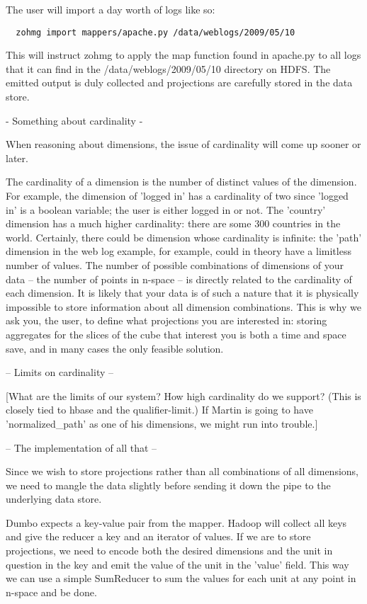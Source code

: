 \documentclass[a4paper,10pt]{book}
\begin{document}
The user will import a day worth of logs like so:

\begin{verbatim}
  zohmg import mappers/apache.py /data/weblogs/2009/05/10
\end{verbatim}

This will instruct zohmg to apply the map function found in apache.py to all
logs that it can find in the /data/weblogs/2009/05/10 directory on HDFS. The
emitted output is duly collected and projections are carefully stored in the
data store.




- Something about cardinality -

When reasoning about dimensions, the issue of cardinality will come up sooner
or later.

The cardinality of a dimension is the number of distinct values of the
dimension. For example, the dimension of 'logged in' has a cardinality of two
since 'logged in' is a boolean variable; the user is either logged in or not.
The 'country' dimension has a much higher cardinality: there are some 300
countries in the world. Certainly, there could be dimension whose cardinality
is infinite: the 'path' dimension in the web log example, for example, could
in theory have a limitless number of values.
The number of possible combinations of dimensions of your data -- the number
of points in n-space -- is directly related to the cardinality of each
dimension. It is likely that your data is of such a nature that it is
physically impossible to store information about all dimension combinations.
This is why we ask you, the user, to define what projections you are
interested in: storing aggregates for the slices of the cube that interest you
is both a time and space save, and in many cases the only feasible solution.

-- Limits on cardinality --

[What are the limits of our system? How high cardinality do we support? (This
is closely tied to hbase and the qualifier-limit.) If Martin is going to have
'normalized_path' as one of his dimensions, we might run into trouble.]

-- The implementation of all that --

Since we wish to store projections rather than all combinations of all
dimensions, we need to mangle the data slightly before sending it down the
pipe to the underlying data store.

Dumbo expects a key-value pair from the mapper. Hadoop will collect all keys
and give the reducer a key and an iterator of values. If we are to store
projections, we need to encode both the desired dimensions and the unit in
question in the key and emit the value of the unit in the 'value' field. This
way we can use a simple SumReducer to sum the values for each unit at any
point in n-space and be done.
\end{document}
